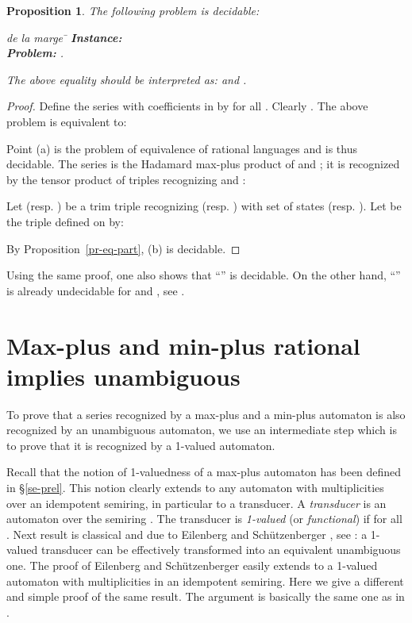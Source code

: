 \documentclass{article}
\newtheorem{prpstn}[thrm]{Proposition}
\newcommand{\1}{\mathbb{1}}
\newcommand{\0}{\mathbb{0}}
\begin{document}
\begin{prpstn}
\label{pr-maxmin}
The following problem is decidable:
\begin{tabbing} 
de la marge \= \kill
\> {\bf Instance:} \hspace*{0.4cm} \=   \\ 
\>  {\bf Problem:} \> \:.
\end{tabbing}
The above equality should be interpreted as:  and
. 
\end{prpstn} 
\begin{proof}
Define the series  with coefficients in  by
 for all . Clearly . The above problem is equivalent to:
 
Point (a) is the problem of equivalence of rational languages and is thus
decidable. 
The series  is the Hadamard max-plus product of  and ;
it is recognized by the tensor product of triples recognizing  and :

Let  (resp. ) be a trim triple
recognizing  (resp. ) with set of states 
(resp. ). 
Let  be the triple defined on  by:

By Proposition~\ref{pr-eq-part}, (b) is decidable.
\end{proof}

Using the same proof, one also shows that ``'' is
decidable. On the other hand, ``'' is already undecidable for
 and , see \cite{krob}. 

\section{Max-plus and min-plus rational implies
  unambiguous}\label{se-minmax}

To prove that a series recognized by a max-plus and a min-plus
automaton is also recognized by an unambiguous 
automaton, we use an intermediate step which is to prove that it is
recognized by a 1-valued automaton. 

\medskip

Recall that the notion of 1-valuedness of a max-plus automaton has
been defined in \S \ref{se-prel}. 
This notion clearly extends to any automaton with multiplicities over
an idempotent semiring, in particular to a transducer. 
A {\em transducer}  is an automaton over the semiring
. 
The transducer  is {\em 1-valued} (or {\em functional}) if 
 for all . 
Next result is classical and due to Eilenberg \cite{eile} and
Sch\"utzenberger \cite{schu76}, see \cite[Chapter IV.4]{bers79}: 
a 1-valued transducer can be effectively transformed into an
equivalent unambiguous one. 
The proof of Eilenberg and Sch\"utzenberger easily extends 
to a 1-valued automaton with multiplicities in an idempotent
semiring. 
Here we give a different and simple proof of the same result. 
The argument is basically the same one as in
\cite[Section 4]{KLMP04}.  
\end{document}
